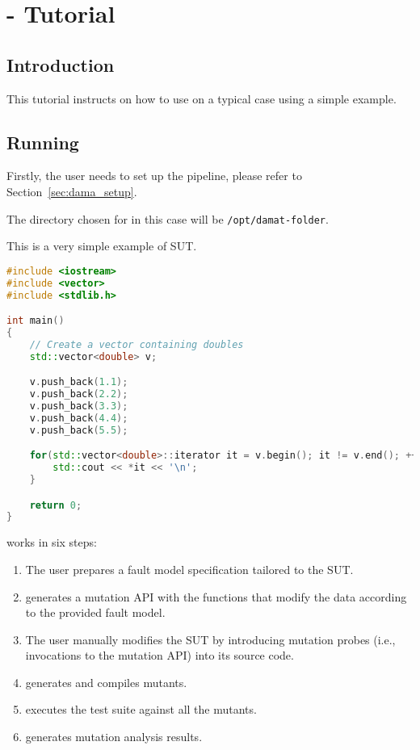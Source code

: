 
\chapter{\DAMA - Tutorial}
\label{chapter:dama:tutorial}

\STARTCHANGEDWPT

\section{Introduction}

This tutorial instructs on how to use \DAMA on a typical case using a simple example.

\section{Running \DAMA}
\label{sec:dama_single_machine}

Firstly, the user needs to set up the \DAMA pipeline, please refer to Section~\ref{sec:dama_setup}.

The directory chosen for \DAMA in this case will be \texttt{/opt/damat-folder}.

This is a very simple example of SUT.

\begin{lstlisting}[language=c++]
#include <iostream>
#include <vector>
#include <stdlib.h>

int main()
{
    // Create a vector containing doubles
    std::vector<double> v;

    v.push_back(1.1);
    v.push_back(2.2);
    v.push_back(3.3);
    v.push_back(4.4);
    v.push_back(5.5);

    for(std::vector<double>::iterator it = v.begin(); it != v.end(); ++it) {
    	std::cout << *it << '\n';
    }

    return 0;
}
\end{lstlisting}

\DAMA works in six steps:

\begin{enumerate}
	\item The user prepares a fault model specification tailored to the SUT.
	\item \DAMA generates a mutation API with the functions that modify the data according to the provided fault model.
	\item The user manually modifies the SUT by introducing mutation probes (i.e., invocations to the mutation API) into its source code.
	\item \DAMA generates and compiles mutants.
	\item \DAMA executes the test suite against all the mutants.
	\item \DAMA generates mutation analysis results.
\end{enumerate}


